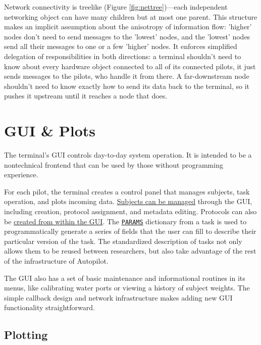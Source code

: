 Network connectivity is treelike (Figure \ref{fig:nettree})---each independent networking object can have many children but at most one parent. This structure makes an implicit assumption about the anisotropy of information flow: 'higher' nodes don't need to send messages to the 'lowest' nodes, and the 'lowest' nodes send all their messages to one or a few 'higher' nodes. It enforces simplified delegation of responsibilities in both directions: a terminal shouldn't need to know about every hardware object connected to all of its connected pilots, it just sends messages to the pilots, who handle it from there. A far-downstream node shouldn't need to know exactly how to send its data back to the terminal, so it pushes it upstream until it reaches a node that does.
\clearpage
\section{GUI \& Plots}
\label{sec:ui}

The terminal's GUI controls day-to-day system operation. It is intended to be a nontechnical frontend that can be used by those without programming experience. 

For each pilot, the terminal creates a control panel that manages subjects, task operation, and plots incoming data. \href{http://docs.auto-pi-lot.com/guide.training.html#creating-a-subject}{Subjects can be managed} through the GUI, including creation, protocol assignment, and metadata editing. Protocols can also be \href{http://docs.auto-pi-lot.com/guide.training.html#creating-a-protocol}{created from within the GUI}. The \hyperref[sec:taskcomponents]{\texttt{PARAMS}} dictionary from a task is used to programmatically generate a series of fields that the user can fill to describe their particular version of the task. The standardized description of tasks not only allows them to be reused between researchers, but also take advantage of the rest of the infrastructure of Autopilot.

The GUI also has a set of basic maintenance and informational routines in its menus, like calibrating water ports or viewing a history of subject weights. The simple callback design and network infrastructure makes adding new GUI functionality straightforward.

\subsection{Plotting}
\label{sec:plotting}

